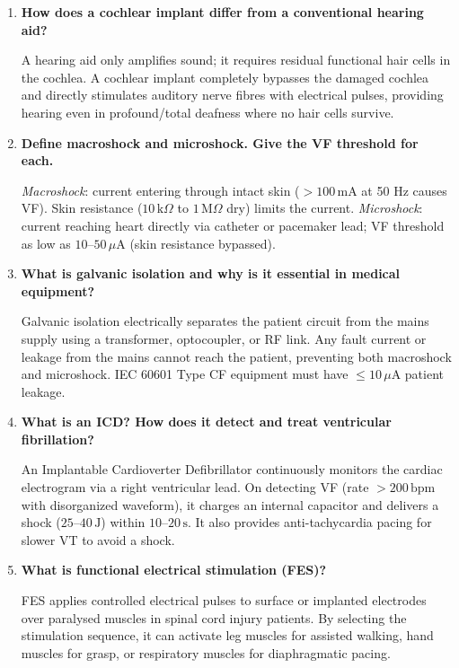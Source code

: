 \documentclass[12pt,a4paper]{article}
\newcommand{\Q}[1]{\textbf{#1}\par\noindent\ignorespaces}
\begin{document}
\begin{tcolorbox}[exambox, title={\textbf{Frequently Asked / Viva Questions}}]
\begin{enumerate}[topsep=0pt, label=\textbf{Q\arabic*.}, itemsep=5pt]
  \item \Q{How does a cochlear implant differ from a conventional hearing aid?}
    A hearing aid only amplifies sound; it requires residual functional hair cells in the cochlea. A cochlear implant completely bypasses the damaged cochlea and directly stimulates auditory nerve fibres with electrical pulses, providing hearing even in profound/total deafness where no hair cells survive.
  \item \Q{Define macroshock and microshock. Give the VF threshold for each.}
    \textit{Macroshock}: current entering through intact skin ($> 100\,\text{mA}$ at 50 Hz causes VF). Skin resistance ($10\,\text{k}\Omega$ to $1\,\text{M}\Omega$ dry) limits the current. \textit{Microshock}: current reaching heart directly via catheter or pacemaker lead; VF threshold as low as $10$--$50\,\mu\text{A}$ (skin resistance bypassed).
  \item \Q{What is galvanic isolation and why is it essential in medical equipment?}
    Galvanic isolation electrically separates the patient circuit from the mains supply using a transformer, optocoupler, or RF link. Any fault current or leakage from the mains cannot reach the patient, preventing both macroshock and microshock. IEC 60601 Type CF equipment must have $\leq 10\,\mu\text{A}$ patient leakage.
  \item \Q{What is an ICD? How does it detect and treat ventricular fibrillation?}
    An Implantable Cardioverter Defibrillator continuously monitors the cardiac electrogram via a right ventricular lead. On detecting VF (rate $> 200\,\text{bpm}$ with disorganized waveform), it charges an internal capacitor and delivers a shock ($25$--$40\,\text{J}$) within $10$--$20\,\text{s}$. It also provides anti-tachycardia pacing for slower VT to avoid a shock.
  \item \Q{What is functional electrical stimulation (FES)?}
    FES applies controlled electrical pulses to surface or implanted electrodes over paralysed muscles in spinal cord injury patients. By selecting the stimulation sequence, it can activate leg muscles for assisted walking, hand muscles for grasp, or respiratory muscles for diaphragmatic pacing.
\end{enumerate}
\end{tcolorbox}
\end{document}
